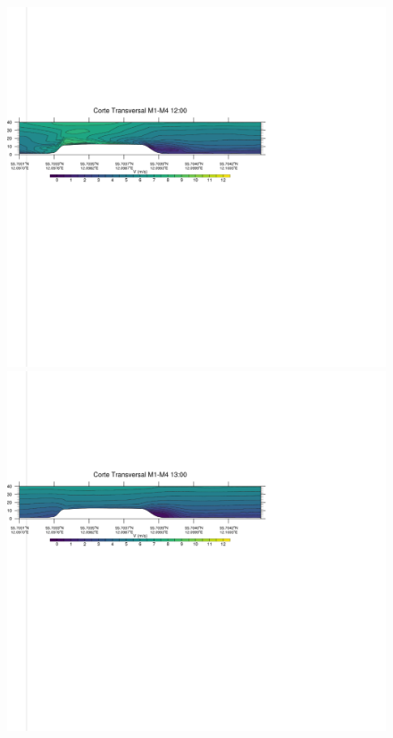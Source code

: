 \begin{figure}[H]
	\centering
	\includegraphics[width=0.90\linewidth,trim={0mm 202.0mm 111mm 106mm},clip]{Imagenes/06/bol_da/1200rot}\\%
	\includegraphics[width=0.90\linewidth,trim={0mm 202.0mm 111mm 106mm},clip]{Imagenes/06/bol_da/1300rot}\\%

\end{figure}
